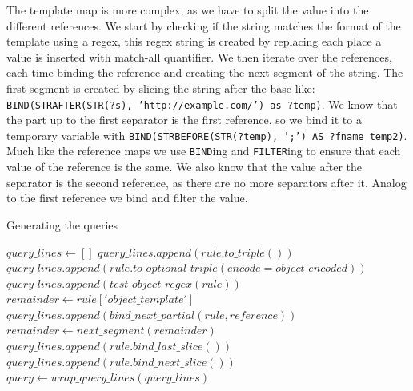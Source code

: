 The template map is more complex, as we have to split the value into the different references. We start by checking if the string matches the format of the template using a regex, this regex string is created by replacing each place a value is inserted with match-all quantifier. We then iterate over the references, each time binding the reference and creating the next segment of the string. The first segment is created by slicing the string after the base like: \texttt{BIND(STRAFTER(STR(?s), 'http://example.com/') as ?temp)}. We know that the part up to the first separator is the first reference, so we bind it to a temporary variable with \texttt{BIND(STRBEFORE(STR(?temp), ';') AS ?fname\_temp2)}. Much like the reference maps we use \texttt{BIND}ing and \texttt{FILTER}ing to ensure that each value of the reference is the same. We also know that the value after the separator is the second reference, as there are no more separators after it. Analog to the first reference we bind and filter the value. 

\begin{algorithm} 
    \caption{Generating the queries}
    \label{alg:generate_query}
    \begin{algorithmic}[1]
        \State $query\_lines \gets []$
                \State $query\_lines.append(rule.to\_triple())$ 
                \State $query\_lines.append(rule.to\_optional\_triple(encode=object\_encoded))$
                \State $query\_lines.append(test\_object\_regex(rule))$
                \State $remainder \gets rule['object\_template']$
                    \State $query\_lines.append(bind\_next\_partial(rule, reference))$
                    \State $remainder \gets next\_segment(remainder)$
                        \State $query\_lines.append(rule.bind\_last\_slice())$
                    \Else
                        \State $query\_lines.append(rule.bind\_next\_slice())$
                    \EndIf
                \EndFor
            \EndIf
        \EndFor
        \State $query \gets wrap\_query\_lines(query\_lines)$
    \end{algorithmic}
\end{algorithm}


